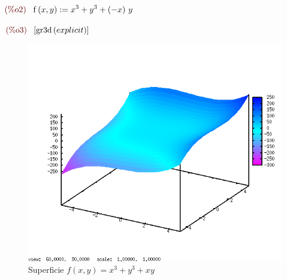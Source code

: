 \documentclass[12pt]{article}
\begin{document}
\begin{math}\displaystyle
\parbox{8ex}{\color{labelcolor}(\%o2) }
\mathrm{f}\left( x,y\right) :={x}^{3}+{y}^{3}+\left( -x\right) \,y
\end{math}

\begin{math}\displaystyle
\parbox{8ex}{\color{labelcolor}(\%o3) }
[\mathrm{gr3d}\left( explicit\right) ]
\end{math}

\begin{figure}[H]
\centering
\includegraphics[scale=0.5]{7.png}
\caption{Superficie $f(x,y)= x^3+y^3+xy$ }
\end{figure}
\end{document}
